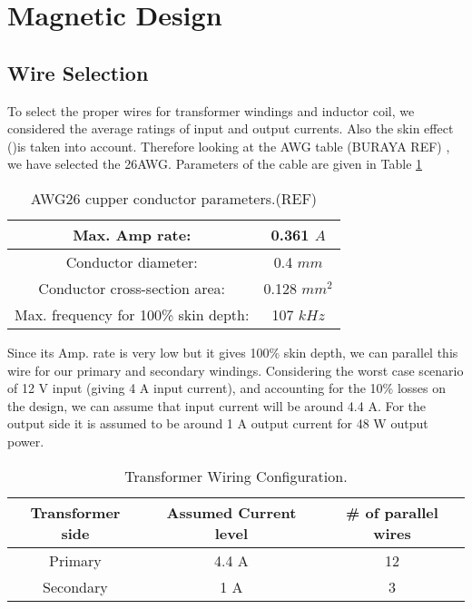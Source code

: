 \section{Magnetic Design}

\subsection{Wire Selection}
To select the proper wires for transformer windings and inductor coil, we considered the average ratings of input and output currents. Also the skin effect ()is taken into account. Therefore looking at the AWG table (BURAYA REF) , we have selected the 26AWG. Parameters of the cable are given in Table \ref{tab:AWG26} 

\begin{table}[H]
    \centering
    \caption{AWG26 cupper conductor parameters.(REF)}
    \label{tab:AWG26}
    \begin{tabular}{|c|c|}
        \hline
        Max. Amp rate:                          & 0.361 $A$   \\
        \hline
        Conductor diameter:                     & 0.4 $mm$    \\
        \hline
        Conductor cross-section area:           & 0.128 $mm^2$\\
        \hline
        Max. frequency for 100\% skin depth:    & 107 $kHz$   \\
        \hline
    \end{tabular}   
\end{table}

Since its Amp. rate is very low but it gives 100\% skin depth, we can parallel this wire for our primary and secondary windings. Considering the worst case scenario of 12 V input (giving 4 A input current), and accounting for the 10\% losses on the design, we can assume that input current will be around 4.4 A. For the output side it is assumed to be around 1 A output current for 48 W output power.

\begin{table}[H]
    \centering
    \caption{Transformer Wiring Configuration.}
    \label{tab:tr_wiring}
    \begin{tabular}{|c|c|c|}
        \hline
        Transformer side            & Assumed Current level & \# of parallel wires   \\
        \hline\hline
        Primary                     & 4.4 A                 & 12                    \\
        \hline
        Secondary                   & 1 A                   & 3                     \\
        \hline
    \end{tabular}
\end{table}


